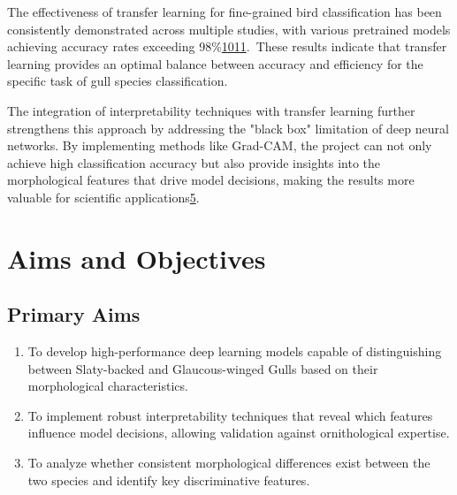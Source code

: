 \documentclass[a4paper,12pt]{article}
\begin{document}
The effectiveness of transfer learning for fine-grained bird classification has been consistently demonstrated across multiple studies, with various pretrained models achieving accuracy rates exceeding 98\%\href{https://www.semanticscholar.org/paper/41b0718279f408654094557156d4eeeb0067b2c4}{10}\href{https://www.semanticscholar.org/paper/770ee68d1b136cd098a018a399d1f69af29faae0}{11}. These results indicate that transfer learning provides an optimal balance between accuracy and efficiency for the specific task of gull species classification.

The integration of interpretability techniques with transfer learning further strengthens this approach by addressing the "black box" limitation of deep neural networks. By implementing methods like Grad-CAM, the project can not only achieve high classification accuracy but also provide insights into the morphological features that drive model decisions, making the results more valuable for scientific applications\href{https://www.atlantis-press.com/article/125986223.pdf}{5}.

\section*{Aims and Objectives}

\subsection*{Primary Aims}
\begin{enumerate}
    \item To develop high-performance deep learning models capable of distinguishing between Slaty-backed and Glaucous-winged Gulls based on their morphological characteristics.
    \item To implement robust interpretability techniques that reveal which features influence model decisions, allowing validation against ornithological expertise.
    \item To analyze whether consistent morphological differences exist between the two species and identify key discriminative features.
\end{enumerate}
\end{document}
